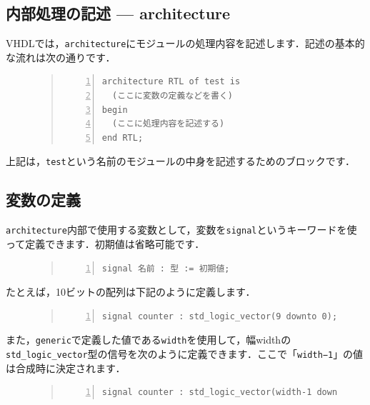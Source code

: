 \documentclass[a4paper,dvipdfmx]{jsarticle}
\begin{document}
\subsection{内部処理の記述 --- architecture}
VHDLでは，\verb|architecture|にモジュールの処理内容を記述します．記述の基本的な流れは次の通りです．
\begin{figure}[H]
\begin{quote}
\begin{Verbatim}[frame=single, numbers=left, baselinestretch=0.8]
architecture RTL of test is
  (ここに変数の定義などを書く)
begin
  (ここに処理内容を記述する)
end RTL;
\end{Verbatim}
\end{quote}
\end{figure}
上記は，\verb|test|という名前のモジュールの中身を記述するためのブロックです．

\subsection{変数の定義}
\verb|architecture|内部で使用する変数として，変数を\verb|signal|というキーワードを使って定義できます．初期値は省略可能です．
\begin{figure}[H]
\begin{quote}
\begin{Verbatim}[frame=single, numbers=left, baselinestretch=0.8]
signal 名前 : 型 := 初期値;
\end{Verbatim}
\end{quote}
\end{figure}

たとえば，10ビットの配列は下記のように定義します．
\begin{figure}[H]
\begin{quote}
\begin{Verbatim}[frame=single, numbers=left, baselinestretch=0.8]
signal counter : std_logic_vector(9 downto 0);
\end{Verbatim}
\end{quote}
\end{figure}

また，\verb|generic|で定義した値である\verb|width|を使用して，幅widthの\verb|std_logic_vector|型の信号を次のように定義できます．ここで「\verb|width−1|」の値は合成時に決定されます．
\begin{figure}[H]
\begin{quote}
\begin{Verbatim}[frame=single, numbers=left, baselinestretch=0.8]
signal counter : std_logic_vector(width-1 downto 0);
\end{Verbatim}
\end{quote}
\end{figure}
\end{document}
